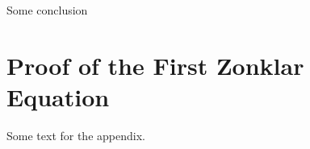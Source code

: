 \documentclass[journal,12pt,onecolumn,draftclsnofoot,]{IEEEtran}
\begin{document}
Some conclusion






%


\appendices
\section{Proof of the First Zonklar Equation}
Some text for the appendix.

\end{document}
